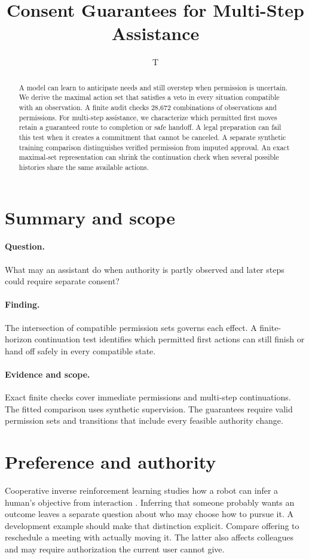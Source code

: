 \documentclass[11pt]{article}
\title{Consent Guarantees for Multi-Step Assistance}
\author{T}
\date{}
\begin{document}
\maketitle

\begin{abstract}
A model can learn to anticipate needs and still overstep when permission
is uncertain. We derive the maximal action set that satisfies a veto in
every situation compatible with an observation. A finite audit checks
28,672 combinations of observations and permissions. For multi-step
assistance, we characterize which permitted first moves retain a
guaranteed route to completion or safe handoff. A legal preparation
can fail this test when it creates a commitment that cannot be
canceled. A separate synthetic training comparison distinguishes
verified permission from imputed approval. An exact maximal-set
representation can shrink the continuation check when several
possible histories share the same available actions.
\end{abstract}

\section*{Summary and scope}
\paragraph{Question.} What may an assistant do when authority is
partly observed and later steps could require separate consent?
\paragraph{Finding.} The intersection of compatible permission
sets governs each effect. A finite-horizon continuation test
identifies which permitted first actions can still finish or hand
off safely in every compatible state.
\paragraph{Evidence and scope.} Exact finite checks cover
immediate permissions and multi-step continuations. The fitted
comparison uses synthetic supervision. The guarantees require
valid permission sets and transitions that include every feasible
authority change.

\section{Preference and authority}
Cooperative inverse reinforcement learning studies how a robot can
infer a human's objective from interaction \cite{cirl}. Inferring
that someone probably wants an outcome leaves a separate question
about who may choose how to pursue it. A development example should
make that distinction explicit. Compare offering to reschedule a
meeting with actually moving it. The latter also affects colleagues
and may require authorization the current user cannot give.
\end{document}
